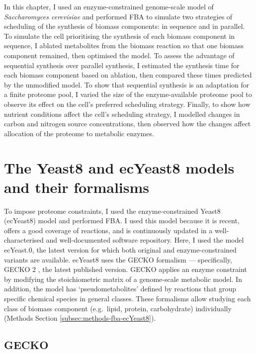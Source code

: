 In this chapter, I used an enzyme-constrained genome-scale model of \textit{Saccharomyces cerevisiae} and performed FBA to simulate two strategies of scheduling of the synthesis of biomass components: in sequence and in parallel.
To simulate the cell prioritising the synthesis of each biomass component in sequence, I ablated metabolites from the biomass reaction so that one biomass component remained, then optimised the model.
To assess the advantage of sequential synthesis over parallel synthesis, I estimated the synthesis time for each biomass component based on ablation, then compared these times predicted by the unmodified model.
To show that sequential synthesis is an adaptation for a finite proteome pool, I varied the size of the enzyme-available proteome pool to observe its effect on the cell's preferred scheduling strategy.
Finally, to show how nutrient conditions affect the cell's scheduling strategy, I modelled changes in carbon and nitrogen source concentrations, then observed how the changes affect allocation of the proteome to metabolic enzymes.


\section{The Yeast8 and ecYeast8 models and their formalisms}
\label{sec:model-yeast8}

To impose proteome constraints, I used the enzyme-constrained Yeast8 (ecYeast8) model \parencite{luConsensusCerevisiaeMetabolic2019} and performed FBA.
I used this model because it is recent, offers a good coverage of reactions, and is continuously updated in a well-characterised and well-documented software repository.
Here, I used the model ec\-Yeast.0, the latest version for which both original and enzyme-constrained variants are available.
ecYeast8 uses the GECKO formalism \parencite{sanchezImprovingPhenotypePredictions2017} --- specifically, GECKO 2 \parencite{domenzainReconstructionCatalogueGenomescale2022}, the latest published version.
GECKO applies an enzyme constraint by modifying the stoichiometric matrix of a genome-scale metabolic model.
In addition, the model has `pseudometabolites' defined by reactions that group specific chemical species in general classes.
These formalisms allow studying each class of biomass component (e.g.\ lipid, protein, carbohydrate) individually (Methods Section \ref{subsec:methods-fba-ecYeast8}).


\subsection{GECKO}
\label{subsec:model-yeast8-gecko}


